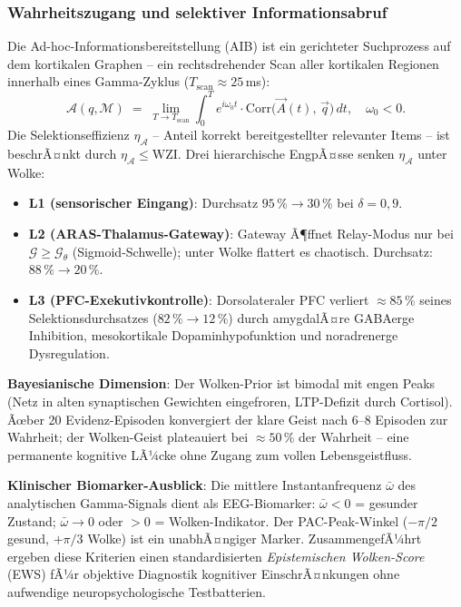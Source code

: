 ﻿\documentclass[a4paper,12pt]{article}
\theoremstyle{definition}
\begin{document}
	\subsubsection{Wahrheitszugang und selektiver Informationsabruf}

	Die Ad-hoc-Informationsbereitstellung (AIB) ist ein gerichteter Suchprozess auf dem kortikalen Graphen -- ein rechtsdrehender Scan aller kortikalen Regionen innerhalb eines Gamma-Zyklus ($T_{\text{scan}} \approx 25$\,ms):
	\[
	\mathcal{A}(q, \mathcal{M}) \;=\; \lim_{T \to T_{\text{scan}}} \int_0^T e^{i\omega_0 t} \cdot \mathrm{Corr}\!\bigl(\vec{A}(t),\, \vec{q}\bigr)\,dt, \quad \omega_0 < 0.
	\]
	Die Selektionseffizienz $\eta_{\mathcal{A}}$ -- Anteil korrekt bereitgestellter relevanter Items -- ist beschrÃ¤nkt durch $\eta_{\mathcal{A}} \leq \mathrm{WZI}$. Drei hierarchische EngpÃ¤sse senken $\eta_{\mathcal{A}}$ unter Wolke:
	\begin{itemize}
		\item[-] \textbf{L1 (sensorischer Eingang)}: Durchsatz $95\,\% \to 30\,\%$ bei $\delta = 0{,}9$.
		\item[-] \textbf{L2 (ARAS-Thalamus-Gateway)}: Gateway Ã¶ffnet Relay-Modus nur bei $\mathcal{G} \geq \mathcal{G}_\theta$ (Sigmoid-Schwelle); unter Wolke flattert es chaotisch. Durchsatz: $88\,\% \to 20\,\%$.
		\item[-] \textbf{L3 (PFC-Exekutivkontrolle)}: Dorsolateraler PFC verliert $\approx 85\,\%$ seines Selektionsdurchsatzes ($82\,\% \to 12\,\%$) durch amygdalÃ¤re GABAerge Inhibition, mesokortikale Dopaminhypofunktion und noradrenerge Dysregulation.
	\end{itemize}

	\textbf{Bayesianische Dimension}: Der Wolken-Prior ist bimodal mit engen Peaks (Netz in alten synaptischen Gewichten eingefroren, LTP-Defizit durch Cortisol). Ãœber 20 Evidenz-Episoden konvergiert der klare Geist nach $6$--$8$ Episoden zur Wahrheit; der Wolken-Geist plateauiert bei $\approx 50\,\%$ der Wahrheit -- eine permanente kognitive LÃ¼cke ohne Zugang zum vollen Lebensgeistfluss.

	\textbf{Klinischer Biomarker-Ausblick}: Die mittlere Instantanfrequenz $\bar{\omega}$ des analytischen Gamma-Signals dient als EEG-Biomarker: $\bar{\omega} < 0$ = gesunder Zustand; $\bar{\omega} \to 0$ oder $> 0$ = Wolken-Indikator. Der PAC-Peak-Winkel ($-\pi/2$ gesund, $+\pi/3$ Wolke) ist ein unabhÃ¤ngiger Marker. ZusammengefÃ¼hrt ergeben diese Kriterien einen standardisierten \emph{Epistemischen Wolken-Score} (EWS) fÃ¼r objektive Diagnostik kognitiver EinschrÃ¤nkungen ohne aufwendige neuropsychologische Testbatterien.
\end{document}
